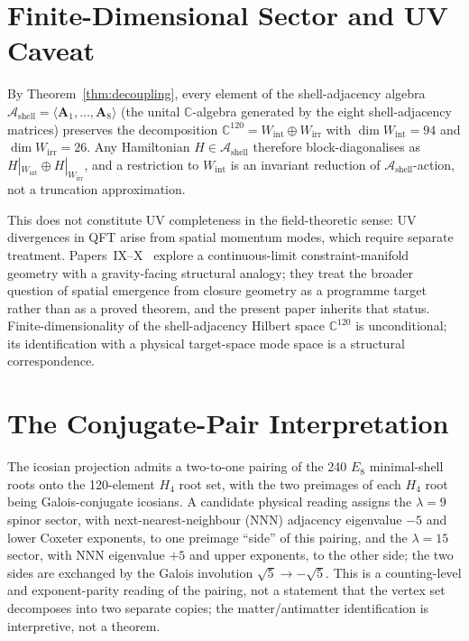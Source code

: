 \documentclass[12pt]{article}
\begin{document}
\section{Finite-Dimensional Sector and UV Caveat}\label{sec:uv}

By Theorem~\ref{thm:decoupling}, every element of the shell-adjacency algebra $\mathcal{A}_{\mathrm{shell}} = \langle \mathbf{A}_1, \ldots, \mathbf{A}_8 \rangle$ (the unital $\mathbb{C}$-algebra generated by the eight shell-adjacency matrices) preserves the decomposition $\mathbb{C}^{120} = W_{\mathrm{int}} \oplus W_{\mathrm{irr}}$ with $\dim W_{\mathrm{int}} = 94$ and $\dim W_{\mathrm{irr}} = 26$. Any Hamiltonian $H \in \mathcal{A}_{\mathrm{shell}}$ therefore block-diagonalises as $H|_{W_{\mathrm{int}}} \oplus H|_{W_{\mathrm{irr}}}$, and a restriction to $W_{\mathrm{int}}$ is an invariant reduction of $\mathcal{A}_{\mathrm{shell}}$-action, not a truncation approximation.

This does not constitute UV completeness in the field-theoretic sense: UV divergences in QFT arise from spatial momentum modes, which require separate treatment. Papers~IX--X~\citep{SmartIX, SmartX} explore a continuous-limit constraint-manifold geometry with a gravity-facing structural analogy; they treat the broader question of spatial emergence from closure geometry as a programme target rather than as a proved theorem, and the present paper inherits that status. Finite-dimensionality of the shell-adjacency Hilbert space $\mathbb{C}^{120}$ is unconditional; its identification with a physical target-space mode space is a structural correspondence.

\section{The Conjugate-Pair Interpretation}\label{sec:conjugate}

The icosian projection admits a two-to-one pairing of the 240 $E_8$ minimal-shell roots onto the 120-element $H_4$ root set, with the two preimages of each $H_4$ root being Galois-conjugate icosians. A candidate physical reading assigns the $\lambda = 9$ spinor sector, with next-nearest-neighbour (NNN) adjacency eigenvalue $-5$ and lower Coxeter exponents, to one preimage ``side'' of this pairing, and the $\lambda = 15$ sector, with NNN eigenvalue $+5$ and upper exponents, to the other side; the two sides are exchanged by the Galois involution $\sqrt{5} \to -\sqrt{5}$. This is a counting-level and exponent-parity reading of the pairing, not a statement that the vertex set decomposes into two separate copies; the matter/antimatter identification is interpretive, not a theorem.
\end{document}
